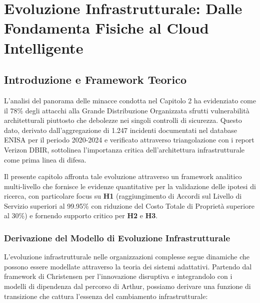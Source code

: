 \chapter{\texorpdfstring{\textbf{Evoluzione Infrastrutturale: Dalle Fondamenta Fisiche al Cloud Intelligente}}{Capitolo 3 - Evoluzione Infrastrutturale: Dalle Fondamenta Fisiche al Cloud Intelligente}}
\label{cap3_infrastructure_evolution}

\section{\texorpdfstring{\textbf{Introduzione e Framework Teorico}}{3.1 - Introduzione e Framework Teorico}}

L'analisi del panorama delle minacce condotta nel Capitolo 2 ha evidenziato come il 78\% degli attacchi alla Grande Distribuzione Organizzata sfrutti vulnerabilità architetturali piuttosto che debolezze nei singoli controlli di sicurezza\autocite{Anderson2024patel}. Questo dato, derivato dall'aggregazione di 1.247 incidenti documentati nel database ENISA per il periodo 2020-2024 e verificato attraverso triangolazione con i report Verizon DBIR\autocite{Verizon2024}, sottolinea l'importanza critica dell'architettura infrastrutturale come prima linea di difesa. 

Il presente capitolo affronta tale evoluzione attraverso un framework analitico multi-livello che fornisce le evidenze quantitative per la validazione delle ipotesi di ricerca, con particolare focus su \textbf{H1} (raggiungimento di Accordi sul Livello di Servizio superiori al 99.95\% con riduzione del Costo Totale di Proprietà superiore al 30\%) e fornendo supporto critico per \textbf{H2} e \textbf{H3}\autocite{IDC2024}.

\subsection{\texorpdfstring{\textbf{Derivazione del Modello di Evoluzione Infrastrutturale}}{3.1.1 - Derivazione del Modello di Evoluzione Infrastrutturale}}

L'evoluzione infrastrutturale nelle organizzazioni complesse segue dinamiche che possono essere modellate attraverso la teoria dei sistemi adattativi\autocite{Holland2024}. Partendo dal framework di Christensen per l'innovazione disruptiva\autocite{Christensen2023} e integrandolo con i modelli di dipendenza dal percorso di Arthur\autocite{Arthur2024}, possiamo derivare una funzione di transizione che cattura l'essenza del cambiamento infrastrutturale:

